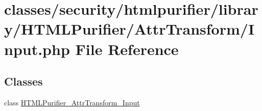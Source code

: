 \hypertarget{Input_8php}{\section{classes/security/htmlpurifier/library/\+H\+T\+M\+L\+Purifier/\+Attr\+Transform/\+Input.php File Reference}
\label{Input_8php}
}
\subsection*{Classes}
\begin{DoxyCompactItemize}
\item 
class \hyperlink{classHTMLPurifier__AttrTransform__Input}{H\+T\+M\+L\+Purifier\+\_\+\+Attr\+Transform\+\_\+\+Input}
\end{DoxyCompactItemize}
